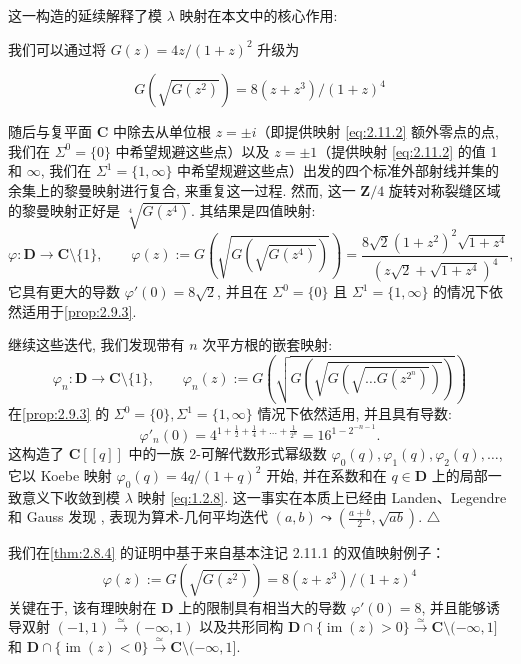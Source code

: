 这一构造的延续解释了模 \(\lambda\) 映射在本文中的核心作用:

\begin{remark}\label{rem:2.11.3}
我们可以通过将 \(G(z) = 4z/(1+z)^2\) 升级为 

\[ G\left(\sqrt{G(z^2)}\right) = 8(z+z^3)/(1+z)^4 \]

随后与复平面 \(\mathbf{C}\) 中除去从单位根 \(z=\pm i\)（即提供映射 \eqref{eq:2.11.2} 额外零点的点, 我们在 \(\Sigma^0 = \{0\}\) 中希望规避这些点）以及 \(z=\pm 1\)（提供映射 \eqref{eq:2.11.2} 的值 1 和 \(\infty\), 我们在 \(\Sigma^1 = \{1,\infty\}\) 中希望规避这些点）出发的四个标准外部射线并集的余集上的黎曼映射进行复合, 来重复这一过程. 
然而, 这一 \(\mathbf{Z}/4\) 旋转对称裂缝区域的黎曼映射正好是 \(\sqrt[4]{G(z^4)}\). 其结果是四值映射:
\begin{equation}\label{eq:2.11.4}
\varphi: \mathbf{D} \to \mathbf{C} \setminus \{1\}, \qquad \varphi(z) := G\left(\sqrt{G\left(\sqrt{G(z^4)}\right)}\right) = \frac{8\sqrt{2}\left(1+z^2\right)^2\sqrt{1+z^4}}{\left(z\sqrt{2}+\sqrt{1+z^4}\right)^4},
\end{equation}
它具有更大的导数 \(\varphi'(0) = 8\sqrt{2}\), 并且在 \(\Sigma^0 = \{0\}\) 且 \(\Sigma^1 = \{1, \infty\}\) 的情况下依然适用于\autoref{prop:2.9.3}.

继续这些迭代, 我们发现带有 \(n\) 次平方根的嵌套映射:
\begin{equation}\label{eq:2.11.5}
\varphi_n : \mathbf{D} \to \mathbf{C} \setminus \{1\}, \qquad \varphi_n(z) := G\left(\sqrt{G\left(\sqrt{G\left(\sqrt{\dots G(z^{2^n})}\right)}\right)}\right)
\end{equation}
在\autoref{prop:2.9.3} 的 \(\Sigma^0 = \{0\}, \Sigma^1 = \{1, \infty\}\) 情况下依然适用, 并且具有导数:
\begin{equation}\label{eq:2.11.6}
\varphi'_n(0) = 4^{1 + \frac{1}{2} + \frac{1}{4} + \dots + \frac{1}{2^n}} = 16^{1 - 2^{-n-1}}.
\end{equation}
这构造了 \(\mathbf{C}[\! [q]\!]\) 中的一族 2-可解代数形式幂级数 \(\varphi_0(q), \varphi_1(q), \varphi_2(q), \dots\), 它以 Koebe 映射 \(\varphi_0(q) = 4q/(1+q)^2\) 开始, 并在系数和在 \(q \in \mathbf{D}\) 上的局部一致意义下收敛到模 \(\lambda\) 映射 \eqref{eq:1.2.8}. 这一事实在本质上已经由 Landen、Legendre 和 Gauss 发现 \cite[§ 1]{BB98}, 表现为算术-几何平均迭代 \((a,b) \leadsto \left(\frac{a+b}{2}, \sqrt{ab}\right)\). \(\triangle\)
\end{remark}

我们在\autoref{thm:2.8.4} 的证明中基于来自基本注记 2.11.1 的双值映射例子：
\[ \varphi(z) := G\left(\sqrt{G(z^2)}\right) = 8(z+z^3)/(1+z)^4 \]
关键在于, 该有理映射在 \(\mathbf{D}\) 上的限制具有相当大的导数 \(\varphi'(0) = 8\), 并且能够诱导双射 \((-1,1) \xrightarrow{\simeq} (-\infty,1)\) 以及共形同构 \(\mathbf{D} \cap \{\operatorname{im}(z) > 0\} \xrightarrow{\simeq} \mathbf{C} \setminus (-\infty,1]\) 和 \(\mathbf{D} \cap \{\operatorname{im}(z) < 0\} \xrightarrow{\simeq} \mathbf{C} \setminus (-\infty,1]\).

